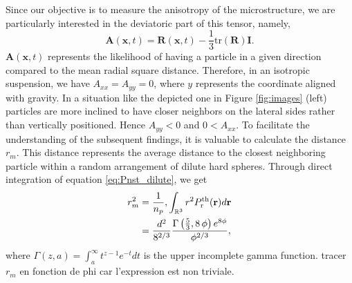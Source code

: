 Since our objective is to measure the anisotropy of the microstructure, we are particularly interested in the deviatoric part of this tensor, namely,
\begin{equation*}
    \textbf{A}(\textbf{x},t) = \textbf{R}(\textbf{x},t) - \frac{1}{3}  \text{tr}(\textbf{R}) \textbf{I}.
\end{equation*}
$\textbf{A}(\textbf{x},t)$ represents the likelihood of having a particle in a given direction compared to the mean radial square distance. Therefore, in an isotropic suspension, we have $A_{xx} = A_{yy} = 0$, where $y$ represents the coordinate aligned with gravity. %
In a situation like the depicted one in Figure \ref{fig:images} (left) particles are more inclined to have closer neighbors on the lateral sides rather than vertically positioned. Hence  $A_{yy} < 0$ and $0 < A_{xx}$. %
To facilitate the understanding of the subsequent findings, it is valuable to calculate the distance $r_m$. This distance represents the average distance to the closest neighboring particle within a random arrangement of dilute hard spheres. Through direct integration of equation \ref{eq:Pnst_dilute}, we get
\begin{align}
    r_m^2
    &= \frac{1}{n_p}, 
    \int_{\mathbb{R}^3} r^2 P_\text{r}^\text{th}(\textbf{r}) d\textbf{r} \\
    &=  \frac{d^2}{8^{2/3}}\frac{\Gamma\left({{5}\over{3}} , 8\,\phi\right)e^{8\phi}}{\phi^{2/3}},
\end{align}
where $\Gamma(z,a) = \int_a^\infty t^{z-1} e^{-t} dt$ is the upper incomplete gamma function. \color{blue} tracer $r_m$ en fonction de phi car l'expression est non triviale. \color{black}

